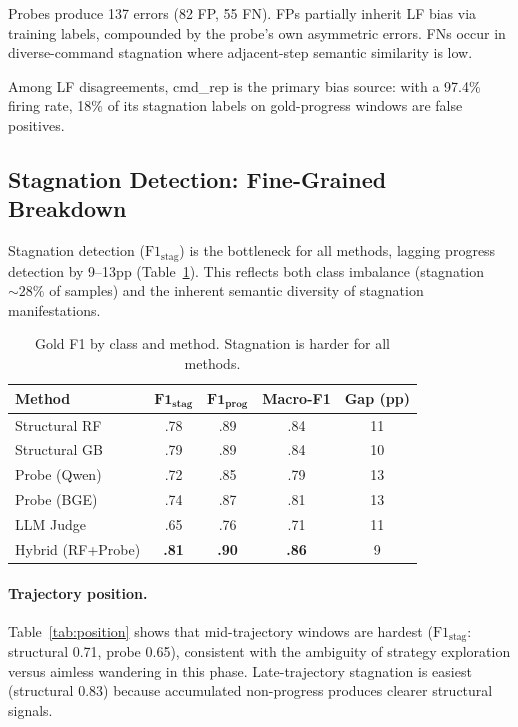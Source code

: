 \documentclass[11pt]{article}
\begin{document}
Probes produce 137 errors (82 FP, 55 FN).
FPs partially inherit LF bias via training labels, compounded by the probe's own asymmetric errors.
FNs occur in diverse-command stagnation where adjacent-step semantic similarity is low.

Among LF disagreements, cmd\_rep is the primary bias source: with a 97.4\% firing rate, 18\% of its stagnation labels on gold-progress windows are false positives.

\subsection{Stagnation Detection: Fine-Grained Breakdown}
\label{sec:f1_stag}

Stagnation detection ($\text{F1}_\text{stag}$) is the bottleneck for all methods, lagging progress detection by 9--13pp (Table~\ref{tab:f1_class}).
This reflects both class imbalance (stagnation ${\sim}28\%$ of samples) and the inherent semantic diversity of stagnation manifestations.

\begin{table}[t]
\centering
\caption{Gold F1 by class and method. Stagnation is harder for all methods.}
\label{tab:f1_class}
\small
\begin{tabular}{lcccc}
\toprule
\textbf{Method} & $\textbf{F1}_\textbf{stag}$ & $\textbf{F1}_\textbf{prog}$ & \textbf{Macro-F1} & \textbf{Gap (pp)} \\
\midrule
Structural RF    & .78 & .89 & .84 & 11 \\
Structural GB    & .79 & .89 & .84 & 10 \\
Probe (Qwen)     & .72 & .85 & .79 & 13 \\
Probe (BGE)      & .74 & .87 & .81 & 13 \\
LLM Judge        & .65 & .76 & .71 & 11 \\
Hybrid (RF+Probe)& \textbf{.81} & \textbf{.90} & \textbf{.86} & 9 \\
\bottomrule
\end{tabular}
\end{table}

\paragraph{Trajectory position.} Table~\ref{tab:position} shows that mid-trajectory windows are hardest ($\text{F1}_\text{stag}$: structural 0.71, probe 0.65), consistent with the ambiguity of strategy exploration versus aimless wandering in this phase.
Late-trajectory stagnation is easiest (structural 0.83) because accumulated non-progress produces clearer structural signals.
\end{document}
